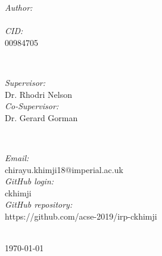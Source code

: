 \begin{titlepage}
\begin{minipage}{0.4\textwidth}
\begin{flushleft} \large
\emph{Author:}\\
\@author %
\\[1.2em]
\emph{CID:}\\
00984705
\end{flushleft}
\end{minipage}
~
\begin{minipage}{0.4\textwidth}
\begin{flushright} \large
\emph{Supervisor:} \\
Dr. Rhodri Nelson
\\[1.2em] 
\emph{Co-Supervisor:} \\
Dr. Gerard Gorman%
\end{flushright}
\end{minipage}\\[2.5cm]
\makeatother


\begin{flushleft}
\emph{Email:}\\
chirayu.khimji18@imperial.ac.uk
\\[1.2em]
\emph{GitHub login:}\\
ckhimji
\\[1.2em]
\emph{GitHub repository:}\\
https://github.com/acse-2019/irp-ckhimji
\end{flushleft}\\[1.5cm]
{\large \today}\\[2cm] %

\vfill %

\end{titlepage}